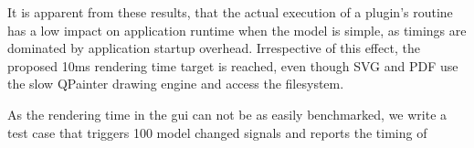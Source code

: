 It is apparent from these results, that the actual execution of a plugin's routine has a low impact on application runtime when the model is simple, as timings are dominated by application startup overhead. Irrespective of this effect, the proposed 10ms rendering time target is reached, even though SVG and PDF use the slow QPainter drawing engine and access the filesystem.

As the rendering time in the \gls{gui} can not be as easily benchmarked, we write a test case that triggers 100 model changed signals and reports the timing of  

